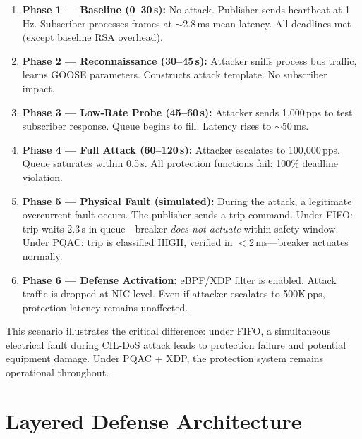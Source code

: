 \documentclass[journal]{IEEEtran}
\begin{document}
\begin{enumerate}[leftmargin=*]
    \item \textbf{Phase 1 --- Baseline (0--30\,s):} No attack. Publisher sends heartbeat at 1\,Hz. Subscriber processes frames at $\sim$2.8\,ms mean latency. All deadlines met (except baseline RSA overhead).
    
    \item \textbf{Phase 2 --- Reconnaissance (30--45\,s):} Attacker sniffs process bus traffic, learns GOOSE parameters. Constructs attack template. No subscriber impact.
    
    \item \textbf{Phase 3 --- Low-Rate Probe (45--60\,s):} Attacker sends 1,000\,pps to test subscriber response. Queue begins to fill. Latency rises to $\sim$50\,ms.
    
    \item \textbf{Phase 4 --- Full Attack (60--120\,s):} Attacker escalates to 100,000\,pps. Queue saturates within 0.5\,s. All protection functions fail: 100\% deadline violation.
    
    \item \textbf{Phase 5 --- Physical Fault (simulated):} During the attack, a legitimate overcurrent fault occurs. The publisher sends a trip command. Under FIFO: trip waits 2.3\,s in queue---breaker \emph{does not actuate} within safety window. Under PQAC: trip is classified HIGH, verified in $<$2\,ms---breaker actuates normally.
    
    \item \textbf{Phase 6 --- Defense Activation:} eBPF/XDP filter is enabled. Attack traffic is dropped at NIC level. Even if attacker escalates to 500K\,pps, protection latency remains unaffected.
\end{enumerate}

This scenario illustrates the critical difference: under FIFO, a simultaneous electrical fault during CIL-DoS attack leads to protection failure and potential equipment damage. Under PQAC + XDP, the protection system remains operational throughout.

\section{Layered Defense Architecture}
\end{document}
